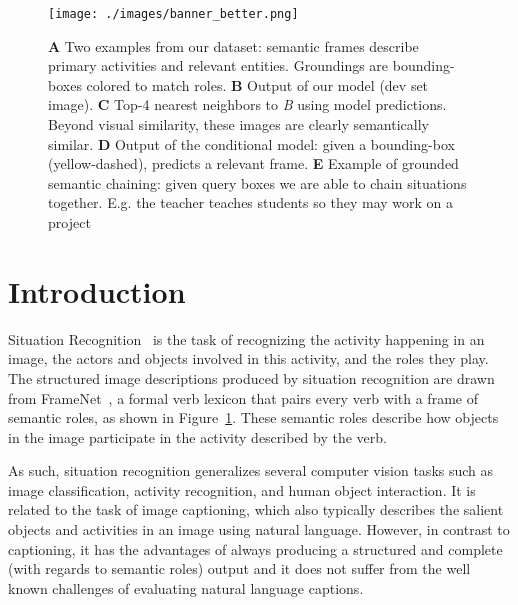 \documentclass[runningheads]{llncs}
\begin{document}
\vspace{-5mm}
\begin{figure}
\centering

\texttt{[image: ./images/banner\_better.png]}

\caption{\textbf{A} Two examples from our dataset: semantic frames describe primary activities and relevant entities. Groundings are bounding-boxes colored to match roles. \textbf{B} Output of our model (dev set image). \textbf{C} Top-4 nearest neighbors to \textit{B} using model predictions. Beyond visual similarity, these images are clearly semantically similar. \textbf{D} Output of the conditional model: given a bounding-box (yellow-dashed), predicts a relevant frame. \textbf{E} Example of grounded semantic chaining: given query boxes we are able to chain situations together. E.g. the teacher teaches students so they may work on a project
}

\label{fig:teaser}
\end{figure}

 
\section{Introduction}

Situation Recognition~\cite{imsitu} is the task of recognizing the activity happening in an image, the actors and objects involved in this activity, and the roles they play. The structured image descriptions produced by situation recognition are drawn from FrameNet~\cite{framenet}, a formal verb lexicon that pairs every verb with a frame of semantic roles, as shown in Figure~\ref{fig:teaser}. These semantic roles describe how objects in the image participate in the activity described by the verb. 

As such, situation recognition generalizes several computer vision tasks such as image classification, activity recognition, and human object interaction. It is related to the task of image captioning, which also typically describes the salient objects and activities in an image using natural language. However, in contrast to captioning, it has the advantages of always producing a structured and complete (with regards to semantic roles) output and it does not suffer from the well known challenges of evaluating natural language captions.
\end{document}
